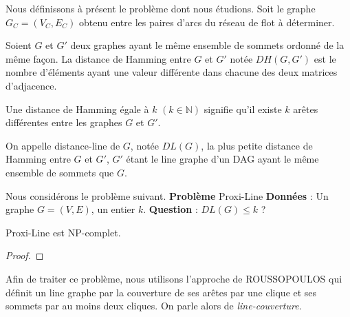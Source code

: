 
Nous d\'efinissons \`a pr\'esent le probl\`eme dont nous \'etudions.
Soit le graphe $G_C = (V_C, E_C)$ obtenu entre les paires d'arcs du r\'eseau de flot \`a d\'eterminer.

\begin{definition}
Soient $G$ et $G'$ deux graphes ayant le m\^eme ensemble  de sommets ordonn\'e de la m\^eme fa\c con.
La distance de Hamming entre $G$ et $G'$ not\'ee $DH(G,G')$ est le nombre d'\'el\'ements ayant une valeur diff\'erente dans chacune des deux matrices d'adjacence.
\end{definition}
Une distance de Hamming \'egale \`a $k$ $(k \in \mathbb{N})$ signifie qu'il existe $k$ ar\^etes diff\'erentes entre  les graphes $G$ et $G'$.

\begin{definition}
On appelle distance-line de $G$, not\'ee $DL(G)$, la plus petite distance de Hamming entre $G$ et $G'$, $G'$ \'etant le line graphe d'un DAG ayant le m\^eme ensemble de sommets que $G$.
\end{definition}

Nous consid\'erons le probl\`eme suivant. \newline
{\bf Probl\`eme} Proxi-Line \newline
{\bf Donn\'ees} : Un graphe $G=(V,E)$, un entier $k$. \newline
{\bf Question} : $DL(G) \le k$ ? \newline

\begin{conjecture}
Proxi-Line est NP-complet.
\end{conjecture}

\begin{proof}
\end{proof}

Afin de traiter ce probl\`eme, nous utilisons l'approche de ROUSSOPOULOS \cite{ROUSSOPOULOS1973108} qui d\'efinit un line graphe par la couverture de ses ar\^etes par une clique et ses sommets par au moins deux cliques. On parle alors de {\em line-couverture}.